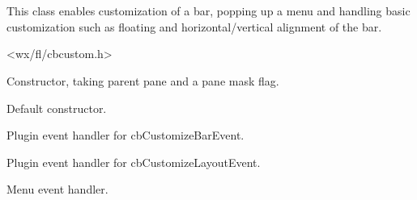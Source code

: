 %
%


\section{}\label{cbsimplecustomizationplugin}


This class enables customization of a bar, popping up a
menu and handling basic customization such as floating
and horizontal/vertical alignment of the bar.




<wx/fl/cbcustom.h>




\label{cbsimplecustomizationplugincbsimplecustomizationplugin}


Constructor, taking parent pane and a pane mask flag.



Default constructor.


\label{cbsimplecustomizationpluginoncustomizebar}


Plugin event handler for cbCustomizeBarEvent.


\label{cbsimplecustomizationpluginoncustomizelayout}


Plugin event handler for cbCustomizeLayoutEvent.


\label{cbsimplecustomizationpluginonmenuitemselected}


Menu event handler.

